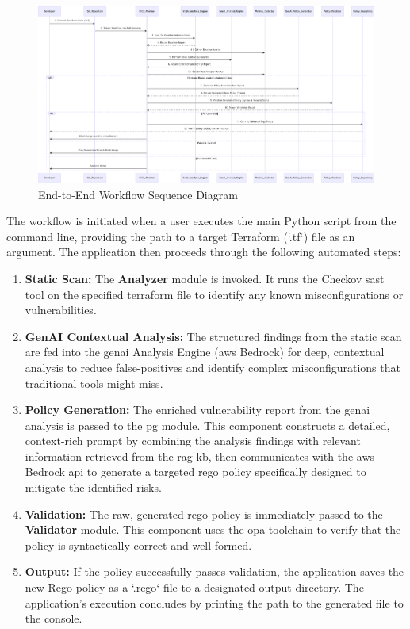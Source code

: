 \begin{landscape}
\thispagestyle{empty}
\begin{figure}[p]
\centering
\includegraphics[width=0.9\linewidth,height=0.7\textheight,keepaspectratio]{Figures/image.pdf}
\caption{End-to-End Workflow Sequence Diagram}
\label{fig:e2e_workflow}
\end{figure}
\end{landscape}

The workflow is initiated when a user executes the main Python script from the command line, providing the path to a target Terraform (`.tf`) file as an argument. The application then proceeds through the following automated steps:

\begin{enumerate}
    \item \textbf{Static Scan:} The \textbf{Analyzer} module is invoked. It runs the Checkov \gls{sast} tool on the specified \gls{terraform} file to identify any known misconfigurations or vulnerabilities.
    \item \textbf{GenAI Contextual Analysis:} The structured findings from the static scan are fed into the \gls{genai} Analysis Engine (\gls{aws} Bedrock) for deep, contextual analysis to reduce \glspl{false-positive} and identify complex misconfigurations that traditional tools might miss.
    \item \textbf{Policy Generation:} The enriched vulnerability report from the \gls{genai} analysis is passed to the \gls{pg} module. This component constructs a detailed, context-rich prompt by combining the analysis findings with relevant information retrieved from the \gls{rag} \gls{kb}, then communicates with the \gls{aws} Bedrock \gls{api} to generate a targeted \gls{rego} policy specifically designed to mitigate the identified risks.
    \item \textbf{Validation:} The raw, generated \gls{rego} policy is immediately passed to the \textbf{Validator} module. This component uses the \gls{opa} toolchain to verify that the policy is syntactically correct and well-formed.
    \item \textbf{Output:} If the policy successfully passes validation, the application saves the new Rego policy as a `.rego` file to a designated output directory. The application's execution concludes by printing the path to the generated file to the console.
\end{enumerate}

